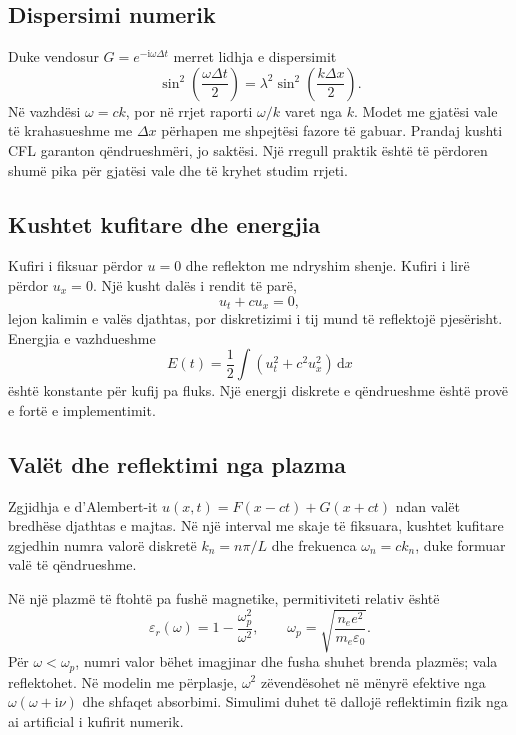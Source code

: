 \documentclass[11pt,oneside,openany]{book}
\newcommand{\dd}{\,\mathrm{d}}
\begin{document}
\subsection{Dispersimi numerik}
Duke vendosur $G=e^{-\mathrm{i}\omega\Delta t}$ merret lidhja e dispersimit
\begin{equation}
 \sin^2\left(\frac{\omega\Delta t}{2}\right)
 =\lambda^2\sin^2\left(\frac{k\Delta x}{2}\right).
\end{equation}
Në vazhdësi $\omega=ck$, por në rrjet raporti $\omega/k$ varet nga $k$. Modet me gjatësi vale të krahasueshme me $\Delta x$ përhapen me shpejtësi fazore të gabuar. Prandaj kushti CFL garanton qëndrueshmëri, jo saktësi. Një rregull praktik është të përdoren shumë pika për gjatësi vale dhe të kryhet studim rrjeti.

\subsection{Kushtet kufitare dhe energjia}
Kufiri i fiksuar përdor $u=0$ dhe reflekton me ndryshim shenje. Kufiri i lirë përdor $u_x=0$. Një kusht dalës i rendit të parë,
\begin{equation}
 u_t+cu_x=0,
\end{equation}
lejon kalimin e valës djathtas, por diskretizimi i tij mund të reflektojë pjesërisht. Energjia e vazhdueshme
\begin{equation}
 E(t)=\frac12\int\left(u_t^2+c^2u_x^2\right)\dd x
\end{equation}
është konstante për kufij pa fluks. Një energji diskrete e qëndrueshme është provë e fortë e implementimit.

\subsection{Valët dhe reflektimi nga plazma}
Zgjidhja e d'Alembert-it $u(x,t)=F(x-ct)+G(x+ct)$ ndan valët bredhëse djathtas e majtas. Në një interval me skaje të fiksuara, kushtet kufitare zgjedhin numra valorë diskretë $k_n=n\pi/L$ dhe frekuenca $\omega_n=ck_n$, duke formuar valë të qëndrueshme.

Në një plazmë të ftohtë pa fushë magnetike, permitiviteti relativ është
\begin{equation}
 \varepsilon_r(\omega)=1-\frac{\omega_p^2}{\omega^2},\qquad
 \omega_p=\sqrt{\frac{n_ee^2}{m_e\varepsilon_0}}.
\end{equation}
Për $\omega<\omega_p$, numri valor bëhet imagjinar dhe fusha shuhet brenda plazmës; vala reflektohet. Në modelin me përplasje, $\omega^2$ zëvendësohet në mënyrë efektive nga $\omega(\omega+\mathrm{i}\nu)$ dhe shfaqet absorbimi. Simulimi duhet të dallojë reflektimin fizik nga ai artificial i kufirit numerik.
\end{document}
